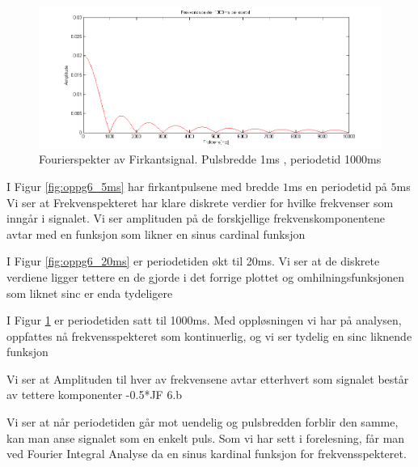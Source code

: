 \documentclass[norsk, a4paper]{article}
\makeatletter
\renewcommand{\subsubsection}{\@startsection{subsubsection}{3}{-2cm}%
{-\baselineskip}{0.5\baselineskip}{\bf\large}}
\newcommand{\jf}[1]{\subsubsection*{JF #1}\vspace*{-2\baselineskip}}
\makeatother
\begin{document}
\begin{figure}
  \begin{center}
      \includegraphics[width= 1\textwidth]{Figurer/oppg6_1000ms.png}
       \caption{Fourierspekter av Firkantsignal. Pulsbredde 1ms , periodetid 1000ms}\label{fig:oppg6_1000ms}
  \end{center}
\end{figure}

I Figur \ref{fig:oppg6_5ms} har firkantpulsene med bredde \(1\)ms en periodetid på \(5\)ms Vi ser at Frekvenspekteret har klare diskrete verdier for hvilke frekvenser som inngår i signalet. Vi ser amplituden på de forskjellige frekvenskomponentene avtar med en funksjon som likner en sinus cardinal funksjon

I Figur \ref{fig:oppg6_20ms} er periodetiden økt til 20ms. Vi ser at de diskrete verdiene ligger tettere en de gjorde i det forrige plottet og omhilningsfunksjonen som liknet sinc er enda tydeligere

I Figur \ref{fig:oppg6_1000ms} er periodetiden satt til 1000ms. Med oppløsningen vi har på analysen, oppfattes nå frekvensspekteret som kontinuerlig, og vi ser tydelig en sinc liknende funksjon

Vi ser at Amplituden til hver av frekvensene avtar etterhvert som signalet består av tettere komponenter 
\jf{6.b}

Vi ser at når periodetiden går mot uendelig og pulsbredden forblir den samme, kan man anse signalet som en enkelt puls. Som vi har sett i forelesning, får man ved Fourier Integral Analyse da en sinus kardinal funksjon for frekvensspekteret. 
\end{document}
